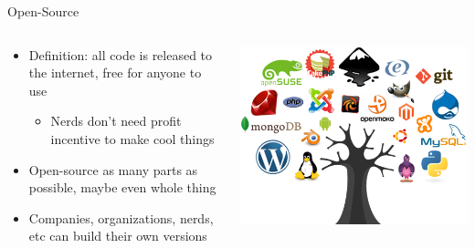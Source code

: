 \documentclass[aspectratio=169]{beamer}
\begin{document}
\begin{frame}{Open-Source}
\begin{columns}[T]
    \begin{column}[T]{0.5\textwidth}
        \begin{itemize}
            \item Definition: all code is released to the internet, free for anyone to use
            \begin{itemize}
                \item Nerds don't need profit incentive to make cool things
            \end{itemize}
            \item Open-source as many parts as possible, maybe even whole thing
            \item Companies, organizations, nerds, etc can build their own versions
        \end{itemize}
    \end{column}
    \begin{column}{0.5\textwidth}
        \includegraphics[width=\textwidth]{imgs/power_to_people/open-source.png}
    \end{column}
\end{columns}
\end{frame}
\end{document}
